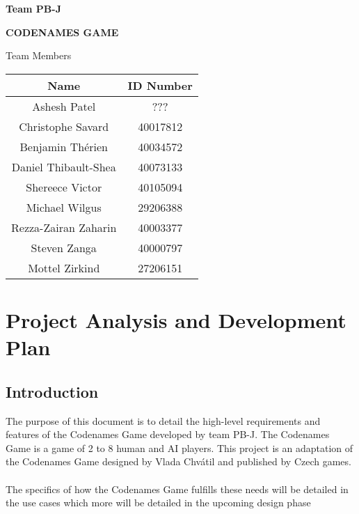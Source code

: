 \documentclass[10pt, a4paper]{article}
\begin{document}
		
\hrulefill
\begin{flushright}
\textbf{Team PB-J}
\end{flushright}
\hrulefill

\vspace*{0.5in}
\centerline{\bf\Large CODENAMES GAME}

\vspace*{1.5in}
\begin{table}[htbp]
\begin{center}
	Team Members\\
\end{center}
\begin{center}
	\begin{tabular}{| c | c |}
	\hline
	Name & ID Number \\
	\hline\hline
	Ashesh Patel & ??? \\
	Christophe Savard & 40017812\\
	Benjamin Th\'erien & 40034572\\
	Daniel Thibault-Shea & 40073133\\
	Shereece Victor & 40105094\\
	Michael Wilgus & 29206388 \\
	Rezza-Zairan Zaharin & 40003377 \\
	Steven Zanga & 40000797\\
	Mottel Zirkind & 27206151\\
	\hline
	\end{tabular}
\end{center}
\end{table}

\newpage
\newpage


\section{Project Analysis and Development Plan}

	\subsection{Introduction}
	
	 The purpose of this document is to detail the high-level requirements and features of the Codenames Game developed by team PB-J. The Codenames Game is a game of 2 to 8 human and AI players. This project is an adaptation of the Codenames Game designed by Vlada Chv\'atil and published by Czech games.\\
	 \\
	 The specifics of how the Codenames Game fulfills these needs will be detailed in the use cases which more will be detailed in the upcoming design phase\\
	
\end{document}
